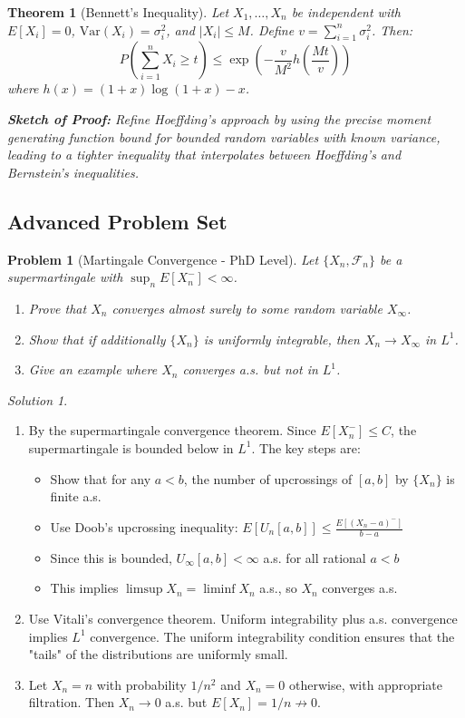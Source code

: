 \documentclass[12pt,a4paper]{article}
\newtheorem{theorem}{Theorem}[section]
\newtheorem{problem}{Problem}[section]
\theoremstyle{remark}
\newtheorem{solution}{Solution}[section]
\begin{document}
\begin{theorem}[Bennett's Inequality]
Let $X_1, \ldots, X_n$ be independent with $E[X_i] = 0$, $\text{Var}(X_i) = \sigma_i^2$, and $|X_i| \leq M$. Define $v = \sum_{i=1}^n \sigma_i^2$. Then:
$$P\left(\sum_{i=1}^n X_i \geq t\right) \leq \exp\left(-\frac{v}{M^2}h\left(\frac{Mt}{v}\right)\right)$$
where $h(x) = (1+x)\log(1+x) - x$.

\textbf{Sketch of Proof:} Refine Hoeffding's approach by using the precise moment generating function bound for bounded random variables with known variance, leading to a tighter inequality that interpolates between Hoeffding's and Bernstein's inequalities.
\end{theorem}

\subsection{Advanced Problem Set}

\begin{problem}[Martingale Convergence - PhD Level]
Let $\{X_n, \mathcal{F}_n\}$ be a supermartingale with $\sup_n E[X_n^-] < \infty$. 
\begin{enumerate}[label=(\alph*)]
\item Prove that $X_n$ converges almost surely to some random variable $X_\infty$.
\item Show that if additionally $\{X_n\}$ is uniformly integrable, then $X_n \to X_\infty$ in $L^1$.
\item Give an example where $X_n$ converges a.s. but not in $L^1$.
\end{enumerate}
\end{problem}

\begin{solution}
\begin{enumerate}[label=(\alph*)]
\item By the supermartingale convergence theorem. Since $E[X_n^-] \leq C$, the supermartingale is bounded below in $L^1$. The key steps are:
\begin{itemize}
\item Show that for any $a < b$, the number of upcrossings of $[a,b]$ by $\{X_n\}$ is finite a.s.
\item Use Doob's upcrossing inequality: $E[U_n[a,b]] \leq \frac{E[(X_n - a)^-]}{b-a}$
\item Since this is bounded, $U_\infty[a,b] < \infty$ a.s. for all rational $a < b$
\item This implies $\limsup X_n = \liminf X_n$ a.s., so $X_n$ converges a.s.
\end{itemize}

\item Use Vitali's convergence theorem. Uniform integrability plus a.s. convergence implies $L^1$ convergence. The uniform integrability condition ensures that the "tails" of the distributions are uniformly small.

\item Let $X_n = n$ with probability $1/n^2$ and $X_n = 0$ otherwise, with appropriate filtration. Then $X_n \to 0$ a.s. but $E[X_n] = 1/n \not\to 0$.
\end{enumerate}
\end{solution}
\end{document}
